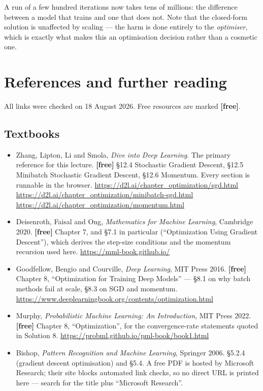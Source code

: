 \documentclass[11pt]{article}
\begin{document}
A run of a few hundred iterations now takes tens of millions: the difference
between a model that trains and one that does not. Note that the closed-form
solution is unaffected by scaling --- the harm is done entirely to the
\emph{optimiser}, which is exactly what makes this an optimisation decision
rather than a cosmetic one.

\newpage
\section{References and further reading}

All links were checked on 18 August 2026. Free resources are marked
\textbf{[free]}.

\subsection*{Textbooks}

\begin{itemize}[leftmargin=*]
  \item Zhang, Lipton, Li and Smola, \emph{Dive into Deep Learning}. The
    primary reference for this lecture. \textbf{[free]} \S12.4 Stochastic
    Gradient Descent, \S12.5 Minibatch Stochastic Gradient Descent, \S12.6
    Momentum. Every section is runnable in the browser.
    \url{https://d2l.ai/chapter_optimization/sgd.html} \\
    \url{https://d2l.ai/chapter_optimization/minibatch-sgd.html} \\
    \url{https://d2l.ai/chapter_optimization/momentum.html}
  \item Deisenroth, Faisal and Ong, \emph{Mathematics for Machine Learning},
    Cambridge 2020. \textbf{[free]} Chapter 7, and \S7.1 in particular
    (``Optimization Using Gradient Descent''), which derives the step-size
    conditions and the momentum recursion used here.
    \url{https://mml-book.github.io/}
  \item Goodfellow, Bengio and Courville, \emph{Deep Learning}, MIT Press 2016.
    \textbf{[free]} Chapter 8, ``Optimization for Training Deep Models'' ---
    \S8.1 on why batch methods fail at scale, \S8.3 on SGD and momentum.
    \url{https://www.deeplearningbook.org/contents/optimization.html}
  \item Murphy, \emph{Probabilistic Machine Learning: An Introduction},
    MIT Press 2022. \textbf{[free]} Chapter 8, ``Optimization'', for the
    convergence-rate statements quoted in Solution 8.
    \url{https://probml.github.io/pml-book/book1.html}
  \item Bishop, \emph{Pattern Recognition and Machine Learning}, Springer 2006.
    \S5.2.4 (gradient descent optimisation) and \S5.4. A free PDF is hosted by
    Microsoft Research; their site blocks automated link checks, so no direct
    URL is printed here --- search for the title plus ``Microsoft Research''.
\end{itemize}
\end{document}
